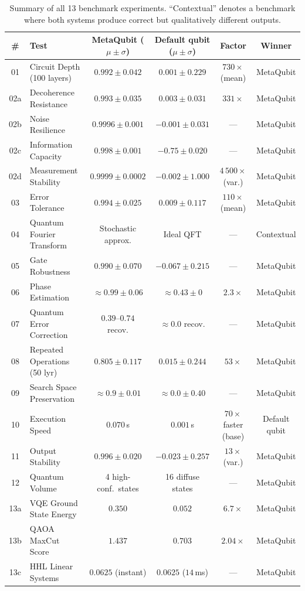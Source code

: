 \documentclass[twocolumn,amsmath,amssymb,prl]{revtex4-2}
\begin{document}
\begin{table}[ht]
\centering
\caption{Summary of all 13 benchmark experiments.  ``Contextual'' denotes a
benchmark where both systems produce correct but qualitatively different outputs.}
\label{tab:summary}
\begin{tabular}{clcccc}
\toprule
\# & Test & MetaQubit ($\mu \pm \sigma$) & Default qubit ($\mu \pm \sigma$) & Factor & Winner \\
\midrule
01  & Circuit Depth (100 layers)   & $0.992 \pm 0.042$ & $0.001 \pm 0.229$ & $730\times$ (mean) & MetaQubit \\
02a & Decoherence Resistance       & $0.993 \pm 0.035$ & $0.003 \pm 0.031$ & $331\times$ & MetaQubit \\
02b & Noise Resilience             & $0.9996 \pm 0.001$ & $-0.001 \pm 0.031$ & — & MetaQubit \\
02c & Information Capacity         & $0.998 \pm 0.001$ & $-0.75 \pm 0.020$ & — & MetaQubit \\
02d & Measurement Stability        & $0.9999 \pm 0.0002$ & $-0.002 \pm 1.000$ & $4\,500\times$ (var.) & MetaQubit \\
03  & Error Tolerance              & $0.994 \pm 0.025$ & $0.009 \pm 0.117$ & $110\times$ (mean) & MetaQubit \\
04  & Quantum Fourier Transform    & Stochastic approx. & Ideal QFT & — & Contextual \\
05  & Gate Robustness              & $0.990 \pm 0.070$ & $-0.067 \pm 0.215$ & — & MetaQubit \\
06  & Phase Estimation             & $\approx 0.99 \pm 0.06$ & $\approx 0.43 \pm 0$ & $2.3\times$ & MetaQubit \\
07  & Quantum Error Correction     & $0.39$--$0.74$ recov. & $\approx 0.0$ recov. & — & MetaQubit \\
08  & Repeated Operations (50 lyr) & $0.805 \pm 0.117$ & $0.015 \pm 0.244$ & $53\times$ & MetaQubit \\
09  & Search Space Preservation    & $\approx 0.9 \pm 0.01$ & $\approx 0.0 \pm 0.40$ & — & MetaQubit \\
10  & Execution Speed              & $0.070$\,s & $0.001$\,s & $70\times$ faster (base) & Default qubit \\
11  & Output Stability             & $0.996 \pm 0.020$ & $-0.023 \pm 0.257$ & $13\times$ (var.) & MetaQubit \\
12  & Quantum Volume               & 4 high-conf.\ states & 16 diffuse states & — & MetaQubit \\
13a & VQE Ground State Energy      & $0.350$ & $0.052$ & $6.7\times$ & MetaQubit \\
13b & QAOA MaxCut Score            & $1.437$ & $0.703$ & $2.04\times$ & MetaQubit \\
13c & HHL Linear Systems           & $0.0625$ (instant) & $0.0625$ ($14$\,ms) & — & MetaQubit \\
\bottomrule
\end{tabular}
\end{table}
\end{document}
